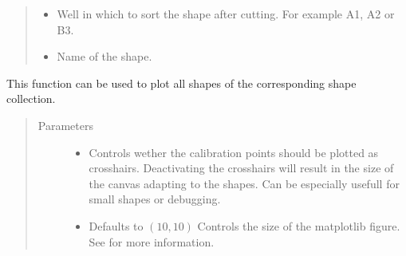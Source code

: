 \documentclass[letterpaper,10pt,english,openany,oneside]{sphinxmanual}
\begin{document}
\begin{fulllineitems}
\begin{fulllineitems}
\begin{quote}
\begin{description}
\begin{itemize}
\item {} 
\sphinxAtStartPar
{} \textendash{} Well in which to sort the shape after cutting. For example A1, A2 or B3.

\item {} 
\sphinxAtStartPar
{} \textendash{} Name of the shape.

\end{itemize}

\end{description}\end{quote}

\end{fulllineitems}


\begin{fulllineitems}
\label{\detokenize{pages/modules:lmd.lib.Collection.plot}}
\sphinxAtStartPar
This function can be used to plot all shapes of the corresponding shape collection.
\begin{quote}\begin{description}
\item[{Parameters}] \leavevmode\begin{itemize}
\item {} 
\sphinxAtStartPar
{} \textendash{} Controls wether the calibration points should be plotted as crosshairs. Deactivating the crosshairs will result in the size of the canvas adapting to the shapes. Can be especially usefull for small shapes or debugging.

\item {} 
\sphinxAtStartPar
{} \textendash{} Defaults to \((10, 10)\) Controls the size of the matplotlib figure. See  for more information.


\end{itemize}
\end{description}
\end{quote}
\end{fulllineitems}
\end{fulllineitems}
\end{document}
